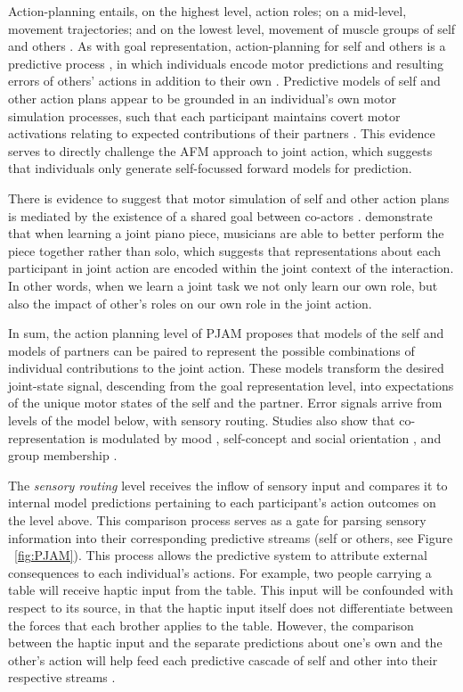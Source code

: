 Action-planning entails, on the highest level, action roles; on a mid-level, movement trajectories; and on the lowest level, movement of muscle groups of self and others \citep{Pesquita2017}.  As with goal representation, action-planning for self and others is a predictive process \citep{Flanagan2003}, in which individuals encode motor predictions and resulting errors of others' actions in addition to their own \citep{VanSchie2004,Radke2011}.  Predictive models of self and other action plans appear to be grounded in an individual's own motor simulation processes, such that each participant maintains covert motor activations relating to expected contributions of their partners \citep{Hollander2012}.  This evidence serves to directly challenge the AFM approach to joint action, which suggests that individuals only generate self-focussed forward models for prediction.

There is evidence to suggest that motor simulation of self and other action plans is mediated by the existence of a shared goal between co-actors \citep{Kourtis2010}.  \textcite{Loehr2016} demonstrate that when learning a joint piano piece, musicians are able to better perform the piece together rather than solo, which suggests that representations about each participant in joint action are encoded within the joint context of the interaction.  In other words, when we learn a joint task we not only learn our own role, but also the impact of other's roles on our own role in the joint action.

In sum, the action planning level of PJAM proposes that models of the self and models of partners can be paired to represent the possible combinations of individual contributions to the joint action. These models transform the desired joint-state signal, descending from the goal representation level, into expectations of the unique motor states of the self and the partner.  Error signals arrive from levels of the model below, with sensory routing.  Studies also show that co-representation is modulated by mood \citep[positive or negative affect, see][]{Kuhbandner2010}, self-concept and social orientation \citep{Colzato2012,Colzato2012a}, and group membership \citep{DeBruijn2008,Iani2013}.

The \textit{sensory routing} level receives the inflow of sensory input and compares it to internal model predictions pertaining to each participant's action outcomes on the level above.  This comparison process serves as a gate for parsing sensory information into their corresponding predictive streams (self or others, see Figure ~\ref{fig:PJAM}). This process allows the predictive system to attribute external consequences to each individual’s actions.   For example, two people carrying a table will receive haptic input from the table. This input will be confounded with respect to its source, in that the haptic input itself does not differentiate between the forces that each brother applies to the table. However, the comparison between the haptic input and the separate predictions about one’s own and the other’s action will help feed each predictive cascade of self and other into their respective streams \citep{Pesquita2017}.

